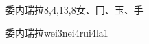 \begin{entry}{委内瑞拉}{8,4,13,8}{⼥、⼌、⽟、⼿}
  \begin{phonetics}{委内瑞拉}{wei3nei4rui4la1}
  \end{phonetics}
\end{entry}
